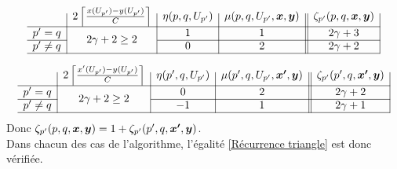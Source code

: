 \begin{gather*}
  \begin{array}{c|c|c|c||c|}
    & 2 \left\lceil \frac{x(U_{p'})-y(U_{p'})}{C} \right\rceil
    & \eta(p,q,U_{p'})
    & \mu(p,q,U_{p'},\bs{x},\bs{y})
    & \zeta_{p'}(p,q,\bs{x},\bs{y})
    \\ \hline
    p'=q
    & \multirow{2}{*}{$2 \gamma + 2 \ge 2$}
    & 1
    & 1
    & 2 \gamma + 3
    \\ \cline{1-1}\cline{3-5}
    p' \ne q
    &
    & 0
    & 2
    & 2\gamma + 2
    \\ \hline
  \end{array}
\end{gather*}

\begin{gather*}
  \begin{array}{c|c|c|c||c|}
    & 2 \left\lceil \frac{x'(U_{p'})-y(U_{p'})}{C} \right\rceil
    & \eta(p',q,U_{p'})
    & \mu(p',q,U_{p'},\bs{x'},\bs{y})
    & \zeta_{p'}(p',q,\bs{x'},\bs{y})
    \\ \hline
    p'=q
    & \multirow{2}{*}{$2 \gamma + 2 \ge 2$}
    & 0
    & 2
    & 2 \gamma + 2
    \\ \cline{1-1}\cline{3-5}
    p' \ne q
    &
    & -1
    & 1
    & 2\gamma + 1
    \\ \hline
  \end{array}
\end{gather*}
Donc $\zeta_{p'}(p,q,\boldsymbol{x},\boldsymbol{y}) = 1 + \zeta_{p'}(p',q,\boldsymbol{x'},\boldsymbol{y})$.
\\

Dans chacun des cas de l'algorithme, l'égalité \ref{Récurrence triangle} est donc vérifiée.
